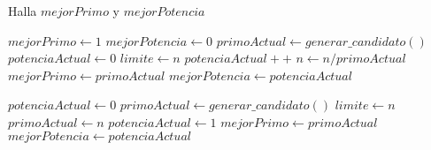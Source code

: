 \begin{algorithm}
\caption{Halla $mejorPrimo$ y $mejorPotencia$}
\begin{algorithmic}[1]
\STATE $mejorPrimo \leftarrow 1$
\STATE $mejorPotencia \leftarrow 0$
\STATE $primoActual \leftarrow generar\_candidato()$
\STATE $potenciaActual \leftarrow 0$
\STATE $limite \leftarrow n$
        \STATE $potenciaActual++$
        \STATE $n \leftarrow n/primoActual$
    \ELSE
            \STATE $mejorPrimo \leftarrow primoActual$
            \STATE $mejorPotencia \leftarrow potenciaActual$
        \ENDIF

        \STATE $potenciaActual \leftarrow 0$
        \STATE $primoActual \leftarrow generar\_candidato()$
        \STATE $limite \leftarrow n$
    \ENDIF
\ENDWHILE
{}
    \STATE $primoActual \leftarrow n$
    \STATE $potenciaActual \leftarrow 1$
\ENDIF
{}
    \STATE $mejorPrimo \leftarrow primoActual$
    \STATE $mejorPotencia \leftarrow potenciaActual$
\ENDIF
\end{algorithmic}
\end{algorithm}
